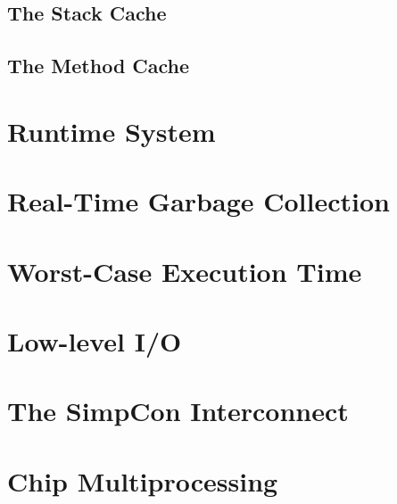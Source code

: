 \clearpage
    \section{The Stack Cache}
    \label{sec:stack}
    

\clearpage
    \section{The Method Cache}
    \label{sec:cache}
    

\chapter{Runtime System}
\label{chap:runtime}

    
    
%    
    
\clearpage
    
    

\chapter{Real-Time Garbage Collection}
\label{chap:rtgc}
    

\chapter{Worst-Case Execution Time}
\label{chap:wcet}
    

\chapter{Low-level I/O}
\label{chap:io}
    

\chapter{The SimpCon Interconnect}
\label{chap:simpcon}
\newcommand{\scgrsc}{0.72}
\newcommand{\scgrp}{simpcon}




\chapter{Chip Multiprocessing}
\label{chap:cmp}



%

